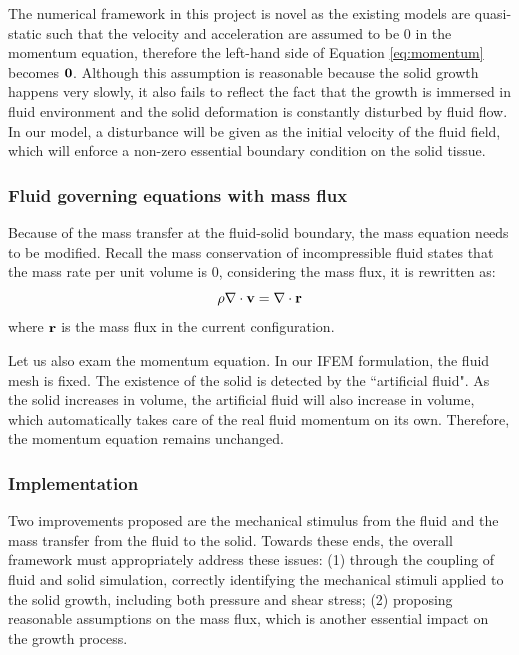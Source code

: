 The numerical framework in this project is novel as the existing models are quasi-static such that the velocity and acceleration are assumed to be $0$ in the momentum equation, therefore the left-hand side of Equation \ref{eq:momentum} becomes $\bold{0}$. Although this assumption is reasonable because the solid growth happens very slowly, it also fails to reflect the fact that the growth is immersed in fluid environment and the solid deformation is constantly disturbed by fluid flow. In our model, a disturbance will be given as the initial velocity of the fluid field, which will enforce a non-zero essential boundary condition on the solid tissue. 

\subsubsection{Fluid governing equations with mass flux}
Because of the mass transfer at the fluid-solid boundary, the mass equation needs to be modified. Recall the mass conservation of incompressible fluid states that the mass rate per unit volume is $0$, considering the mass flux, it is rewritten as:
\begin{equation}
\rho \nabla \cdot \bold{v} = \nabla \cdot \bold{r}
\end{equation}
where $\bold{r}$ is the mass flux in the current configuration. 

Let us also exam the momentum equation. In our IFEM formulation, the fluid mesh is fixed. The existence of the solid is detected by the ``artificial fluid". As the solid increases in volume, the artificial fluid will also increase in volume, which automatically takes care of the real fluid momentum on its own. Therefore, the momentum equation remains unchanged.

\subsubsection{Implementation}
Two improvements proposed are the mechanical stimulus from the fluid and the mass transfer from the fluid to the solid. Towards these ends, the overall framework must appropriately address these issues: (1) through the coupling of fluid and solid simulation, correctly identifying the mechanical stimuli applied to the solid growth, including both pressure and shear stress; (2) proposing reasonable assumptions on the mass flux, which is another essential impact on the growth process.

